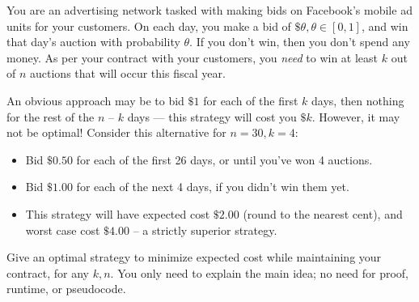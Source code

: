 \documentclass{article}\usepackage[utf8]{inputenc}\usepackage[margin=0.4cm,top=0.4cm,bottom=0.4cm]{geometry}
\begin{document}
\noindent You are an advertising network tasked with making bids on Facebook's mobile ad units for your customers.
On each day, you make a bid of $\$\theta, \theta \in [0,1]$, and win that day's auction with probability $\theta$. If you don't win, then you don't spend any money. As per your contract with your customers, you {\it need} to win at least $k$ out of $n$ auctions that will occur this fiscal year.

\vspace{4pt}
\noindent An obvious approach may be to bid $\$1$ for each of the first $k$ days, then nothing for the rest of the $n$ -- $k$ days --- this strategy will cost you $\$k$. However, it may not be optimal! Consider this alternative for $n = 30, k = 4$:
\begin{itemize}
\item Bid $\$0.50$ for each of the first 26 days, or until you've won 4 auctions.
\item Bid $\$1.00$ for each of the next 4 days, if you didn't win them yet.
\item This strategy will have expected cost $\$2.00$ (round to the nearest cent), and worst case cost $\$4.00$ -- a strictly superior strategy.
\end{itemize}
\vspace{4pt}
\noindent Give an optimal strategy to minimize expected cost while maintaining your contract, for any $k, n$. You only need to explain the main idea; no need for proof, runtime, or pseudocode.
\end{document}
